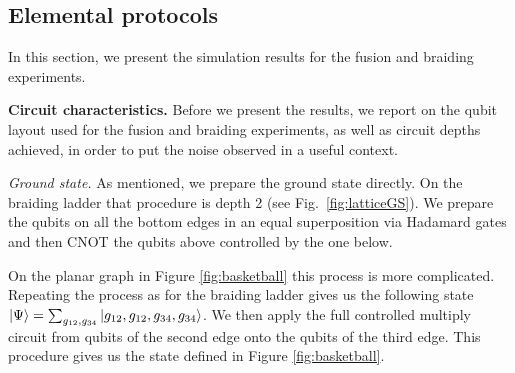 \documentclass[a4paper,twocolumn,11pt]{quantumarticle}
\begin{document}
\subsection{Elemental protocols}\label{sec:num:elem}

In this section, we present the simulation results for the fusion and braiding experiments.

\textbf{Circuit characteristics.} Before we present the results, we report on the qubit layout used for the fusion and braiding experiments, as well as circuit depths achieved, in order to put the noise observed in a useful context.


\emph{Ground state.} As mentioned, we prepare the ground state directly. On the braiding ladder that procedure is depth 2 (see Fig.~\ref{fig:latticeGS}). We prepare the qubits on all the bottom edges in an equal superposition via Hadamard gates and then CNOT the qubits above controlled by the one below. 

On the planar graph in Figure \ref{fig:basketball} this process is more complicated. Repeating the process as for the braiding ladder gives us the following state $\ket{\Psi} = \sum_{g_{12},g_{34}}\ket{g_{12},g_{12}, g_{34}, g_{34}}$. We then apply the full controlled multiply circuit from qubits of the second edge onto the qubits of the third edge. This procedure gives us the state defined in Figure \ref{fig:basketball}.
\end{document}
